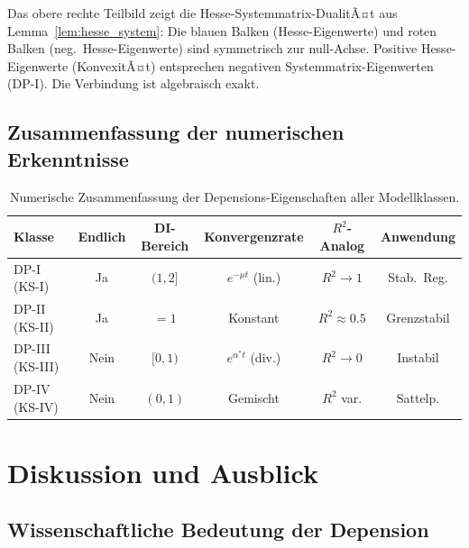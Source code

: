 ﻿\documentclass[12pt, a4paper]{article}
\theoremstyle{definition}
\theoremstyle{remark}
\begin{document}
Das obere rechte Teilbild zeigt die Hesse-Systemmatrix-DualitÃ¤t aus
Lemma~\ref{lem:hesse_system}: Die blauen Balken (Hesse-Eigenwerte) und roten Balken
(neg.\ Hesse-Eigenwerte) sind symmetrisch zur null-Achse. Positive Hesse-Eigenwerte
(KonvexitÃ¤t) entsprechen negativen Systemmatrix-Eigenwerten (DP-I). Die Verbindung
ist algebraisch exakt.

\subsection{Zusammenfassung der numerischen Erkenntnisse}

\begin{table}[H]
  \centering
  \caption{Numerische Zusammenfassung der Depensions-Eigenschaften aller Modellklassen.}
  \label{tab:zusammenfassung}
  \renewcommand{\arraystretch}{1.4}
  \begin{tabular}{lccccc}
    \toprule
    Klasse & Endlich & DI-Bereich & Konvergenzrate & $R^2$-Analog & Anwendung \\
    \midrule
    DP-I (KS-I) & Ja & $(1, 2]$ & $e^{-\mu t}$ (lin.) & $R^2 \to 1$ & Stab.~Reg. \\
    DP-II (KS-II) & Ja & $= 1$ & Konstant & $R^2 \approx 0.5$ & Grenzstabil \\
    DP-III (KS-III) & Nein & $[0, 1)$ & $e^{\alpha^* t}$ (div.) & $R^2 \to 0$ & Instabil \\
    DP-IV (KS-IV) & Nein & $(0, 1)$ & Gemischt & $R^2$ var. & Sattelp. \\
    \bottomrule
  \end{tabular}
\end{table}

\section{Diskussion und Ausblick}
\label{sec:ausblick}

\subsection{Wissenschaftliche Bedeutung der Depension}
\end{document}
